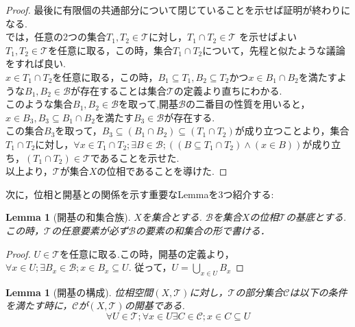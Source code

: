 \documentclass[dvipdfmx]{jbook}
\newtheorem{lemma}[theorem]{Lemma}
\theoremstyle{remark}
\theoremstyle{plain}
\begin{document}
\begin{proof}
	最後に有限個の共通部分について閉じていることを示せば証明が終わりになる.\\
	では，任意の2つの集合$T_1 , T_2 \in \mathcal{T}$に対し，$T_1 \cap T_2 \in \mathcal{T}$ を示せばよい\\
	$T_1 , T_2 \in \mathcal{T}$を任意に取る，この時，集合$T_1 \cap T_2$について，先程と似たような議論をすれば良い.\\
	$x \in T_1 \cap T_2 $を任意に取る，この時，$B_1 \subseteq T_1, B_2 \subseteq T_2$かつ$x \in B_1 \cap B_2$を満たすような$B_1,B_2 \in \mathcal{B}$が存在することは集合$\mathcal{T}$の定義より直ちにわかる.\\
	このような集合$B_1, B_2 \in \mathcal{B}$を取って,開基$\mathcal{B}$の二番目の性質を用いると，$x \in B_3 ,B_3 \subseteq B_1 \cap B_2 $を満たす$B_3 \in \mathcal{B}$が存在する.\\
	この集合$B_3$を取って，$B_3 \subseteq \left( B_1 \cap B_2  \right) \subseteq \left( T_1 \cap T_2 \right) $が成り立つことより，集合$T_1 \cap T_2 $に対し，$\forall x \in T_1 \cap T_2 ; \exists B \in \mathcal{B} ; \left( \left( B  \subseteq T_1  \cap T_2 \right) \land \left( x \in B \right) \right) $が成り立ち，$\left( T_1 \cap T_2 \right) \in \mathcal{T}$であることを示せた.\\
	以上より，$\mathcal{T}$が集合$X$の位相であることを導けた.
\end{proof}


次に，位相と開基との関係を示す重要なLemmaを3つ紹介する:

\begin{lemma}[開基の和集合族]
	$X$を集合とする. $\mathcal{B}$を集合$X$の位相$\mathcal{T}$の基底とする.この時，$\mathcal{T}$の任意要素が必ず$\mathcal{B}$の要素の和集合の形で書ける．
\end{lemma}

\begin{proof}
	$U\in \mathcal{T}$を任意に取る.この時，開基の定義より，$\forall x \in U ; \exists B_x \in \mathcal{B}; x \in B_x \subseteq U.$ 従って，$U=\bigcup_{x \in U}B_x$
\end{proof}






\begin{lemma}[開基の構成]\label{lem:1od}
	位相空間$(X,\mathcal{T})$に対し，$\mathcal{T}$の部分集合$\mathcal{C}$は以下の条件を満たす時に，$\mathcal{C}$が$(X,\mathcal{T})$の開基である.
	$$\forall U \in \mathcal{T};\forall x \in U \exists C \in \mathcal{C}; x \in C \subseteq U$$
\end{lemma}
\end{document}
